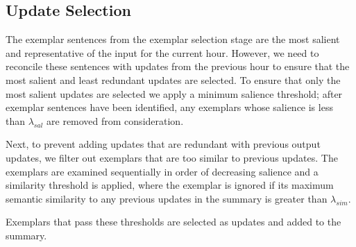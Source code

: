 \subsection{Update Selection}
\label{sec:upsel}


The exemplar sentences from the exemplar selection stage are the most salient 
and representative of the input for the current hour. However, we need to 
reconcile these sentences with updates from the previous hour to ensure that 
the most salient and least redundant  updates are selected. To ensure that 
only the most salient updates are selected we apply a minimum salience 
threshold; after exemplar sentences have been identified, any exemplars whose 
salience is less than $\lambda_{sal}$ are removed from consideration. 


Next, to prevent adding updates that are redundant with previous output 
updates, we filter out exemplars that are too similar to previous updates.
The exemplars are examined sequentially in order of decreasing salience and  a similarity threshold is applied, where the exemplar is ignored if its maximum 
semantic similarity to any previous updates in the summary is greater than 
$\lambda_{sim}$.


Exemplars that pass these thresholds are selected as updates and added
to the summary.
